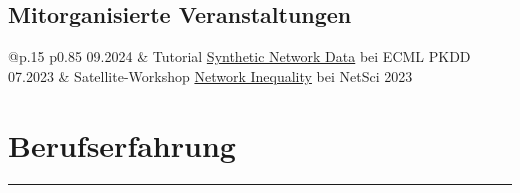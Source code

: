 \documentclass[11pt]{article} %
\begin{document}
\subsection*{Mitorganisierte Veranstaltungen}
\label{organizing}
\begin{longtable}[l]{@{}p{.15\textwidth} p{0.85\textwidth}}
  09.2024     & Tutorial \href{https://sites.google.com/view/snma-tutorial/2024}{Synthetic Network Data} bei ECML PKDD\\
  07.2023     & Satellite-Workshop \href{https://sites.google.com/view/netin-satellite-2023/home}{Network Inequality} bei NetSci 2023\\
\end{longtable}



\section*{Berufserfahrung}
\label{exp_other}



\centering
\rule{0.25\linewidth}{0.4pt}\\
\end{document}
